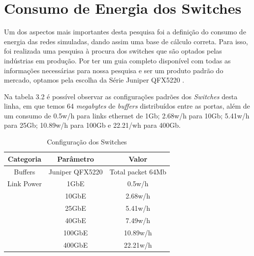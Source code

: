 
\section{Consumo de Energia dos Switches}

Um dos aspectos mais importantes desta pesquisa foi a definição do consumo de energia das redes simuladas, dando assim uma base de cálculo correta. Para isso, foi realizada uma pesquisa à procura dos switches que são optados pelas indústrias em produção. Por ter um guia completo disponível com todas as informações necessárias para nossa pesquisa e ser um produto padrão do mercado, optamos pela escolha da Série Juniper QFX5220 \cite{QFX5220Guide}.

Na tabela 3.2 é possível observar as configurações padrões dos \emph{Switches} desta linha, em que temos 64 \emph{megabytes} de \emph{buffers} distribuídos entre as portas, além de um consumo de 0.5w/h para links ethernet de 1Gb; 2.68w/h para 10Gb; 5.41w/h para 25Gb; 10.89w/h para 100Gb e 22.21/wh para 400Gb. 

\begin{table}[!htp]
\centering
\caption{Configuração dos Switches}
\label{Configuração dos Switches}
\def\arraystretch{1.2}
\begin{tabular}{c c c}
\hline
Categoria & Parâmetro & Valor \\
\hline
Buffers & Juniper QFX5220 & Total packet 64Mb\\
Link Power & 1GbE & 0.5w/h\\
 & 10GbE & 2.68w/h\\
 & 25GbE & 5.41w/h\\
 & 40GbE & 7.49w/h\\
 & 100GbE & 10.89w/h\\
 & 400GbE & 22.21w/h\\
\hline
\end{tabular}
\end{table}

